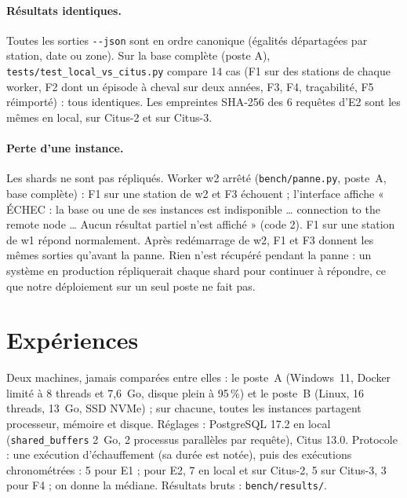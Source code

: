 \documentclass{rapportClass}
\newcommand{\cmd}[1]{\texttt{#1}}
\begin{document}
\paragraph{Résultats identiques.} Toutes les sorties \cmd{-{}-json} sont en ordre canonique (égalités départagées
par station, date ou zone). Sur la base complète (poste A), \cmd{tests/test\_local\_vs\_citus.py} compare 14 cas (F1 sur des
stations de chaque worker, F2 dont un épisode à cheval sur deux années, F3, F4, traçabilité, F5 réimporté) :
tous identiques. Les empreintes SHA-256 des 6 requêtes d'E2 sont les mêmes en local, sur Citus-2 et sur Citus-3.

\paragraph{Perte d'une instance.} Les shards ne sont pas répliqués. Worker w2 arrêté (\cmd{bench/panne.py},
poste~A, base complète) : F1 sur une station de w2 et F3 échouent ; l'interface affiche « ÉCHEC : la base ou une de ses
instances est indisponible \ldots{} connection to the remote node \ldots{} Aucun résultat partiel n'est affiché »
(code 2). F1 sur une station de w1 répond normalement. Après redémarrage de w2, F1 et F3 donnent les mêmes sorties
qu'avant la panne. Rien n'est récupéré pendant la panne : un système en production répliquerait chaque shard pour
continuer à répondre, ce que notre déploiement sur un seul poste ne fait pas.

\section{Expériences}\label{sec:exp}

Deux machines, jamais comparées entre elles : le poste~A (Windows~11, Docker limité à 8 threads et 7,6~Go, disque plein à 95\,\%) et le poste~B (Linux, 16 threads, 13~Go, SSD NVMe) ; sur chacune, toutes les instances partagent processeur, mémoire et disque. Réglages : PostgreSQL 17.2 en local
(\cmd{shared\_buffers} 2~Go, 2 processus parallèles par requête), Citus 13.0.
Protocole : une exécution d'échauffement (sa durée est notée), puis des exécutions chronométrées : 5 pour E1 ;
pour E2, 7 en local et sur Citus-2, 5 sur Citus-3, 3 pour F4 ; on donne la médiane. Résultats bruts : \cmd{bench/results/}.
\end{document}
